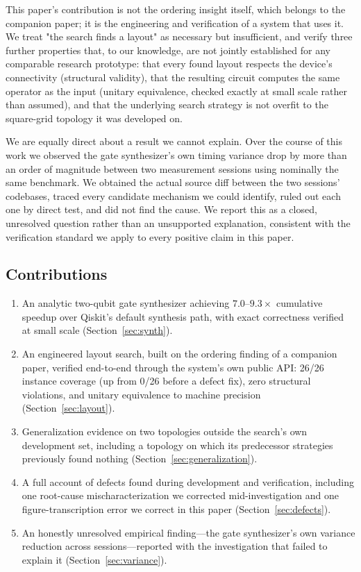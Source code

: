 \documentclass[11pt]{article}
\begin{document}
This paper's contribution is not the ordering insight itself, which
belongs to the companion paper; it is the engineering and verification
of a system that uses it. We treat "the search finds a layout" as
necessary but insufficient, and verify three further properties that,
to our knowledge, are not jointly established for any comparable
research prototype: that every found layout respects the device's
connectivity (structural validity), that the resulting circuit computes
the same operator as the input (unitary equivalence, checked exactly at
small scale rather than assumed), and that the underlying search
strategy is not overfit to the square-grid topology it was developed
on.

We are equally direct about a result we cannot explain. Over the course
of this work we observed the gate synthesizer's own timing variance
drop by more than an order of magnitude between two measurement
sessions using nominally the same benchmark. We obtained the actual
source diff between the two sessions' codebases, traced every
candidate mechanism we could identify, ruled out each one by direct
test, and did not find the cause. We report this as a closed,
unresolved question rather than an unsupported explanation, consistent
with the verification standard we apply to every positive claim in this
paper.

\subsection{Contributions}

\begin{enumerate}
\item An analytic two-qubit gate synthesizer achieving
$7.0$--$9.3\times$ cumulative speedup over Qiskit's default synthesis
path, with exact correctness verified at small scale
(Section~\ref{sec:synth}).
\item An engineered layout search, built on the ordering finding of a
companion paper, verified end-to-end through the system's own public
API: 26/26 instance coverage (up from 0/26 before a defect fix),
zero structural violations, and unitary equivalence to machine
precision (Section~\ref{sec:layout}).
\item Generalization evidence on two topologies outside the search's
own development set, including a topology on which its predecessor
strategies previously found nothing (Section~\ref{sec:generalization}).
\item A full account of defects found during development and
verification, including one root-cause mischaracterization we
corrected mid-investigation and one figure-transcription error we
correct in this paper (Section~\ref{sec:defects}).
\item An honestly unresolved empirical finding---the gate synthesizer's
own variance reduction across sessions---reported with the
investigation that failed to explain it (Section~\ref{sec:variance}).
\end{enumerate}
\end{document}

